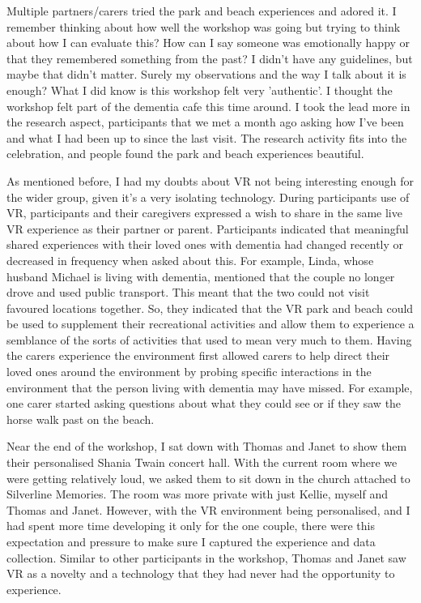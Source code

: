 Multiple partners/carers tried the park and beach experiences and adored it. I remember thinking about how well the workshop was going but trying to think about how I can evaluate this? How can I say someone was emotionally happy or that they remembered something from the past? I didn't have any guidelines, but maybe that didn't matter. Surely my observations and the way I talk about it is enough? What I did know is this workshop felt very 'authentic'. I thought the workshop felt part of the dementia cafe this time around. I took the lead more in the research aspect, participants that we met a month ago asking how I've been and what I had been up to since the last visit. The research activity fits into the celebration, and people found the park and beach experiences beautiful.

As mentioned before, I had my doubts about VR not being interesting enough for the wider group, given it's a very isolating technology. During participants use of VR, participants and their caregivers expressed a wish to share in the same live VR experience as their partner or parent. Participants indicated that meaningful shared experiences with their loved ones with dementia had changed recently or decreased in frequency when asked about this. For example, Linda, whose husband Michael is living with dementia, mentioned that the couple no longer drove and used public transport. This meant that the two could not visit favoured locations together. So, they indicated that the VR park and beach could be used to supplement their recreational activities and allow them to experience a semblance of the sorts of activities that used to mean very much to them. Having the carers experience the environment first allowed carers to help direct their loved ones around the environment by probing specific interactions in the environment that the person living with dementia may have missed. For example, one carer started asking questions about what they could see or if they saw the horse walk past on the beach.

Near the end of the workshop, I sat down with Thomas and Janet to show them their personalised Shania Twain concert hall. With the current room where we were getting relatively loud, we asked them to sit down in the church attached to Silverline Memories. The room was more private with just Kellie, myself and Thomas and Janet. However, with the VR environment being personalised, and I had spent more time developing it only for the one couple, there were this expectation and pressure to make sure I captured the experience and data collection. Similar to other participants in the workshop, Thomas and Janet saw VR as a novelty and a technology that they had never had the opportunity to experience.

